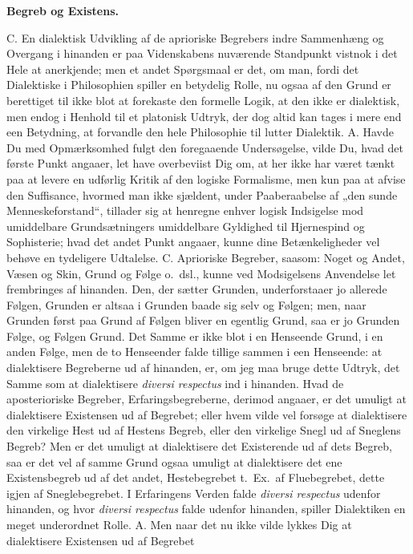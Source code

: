 \documentclass[12pt,a4paper]{book}
\begin{document}
\textbf{Begreb og Existens.}
C. En dialektisk Udvikling af de aprioriske Begrebers indre Sammenhæng
og Overgang i hinanden er paa Videnskabens nuværende Standpunkt vistnok
i det Hele at anerkjende; men et andet Spørgsmaal er det, om man, fordi
det Dialektiske i Philosophien spiller en betydelig Rolle, nu ogsaa af
den Grund er berettiget til ikke blot at forekaste den formelle Logik,
at den ikke er dialektisk, men endog i Henhold til et platonisk Udtryk,
der dog altid kan tages i mere end een Betydning, at forvandle den hele
Philosophie til lutter Dialektik. A. Havde Du med Opmærksomhed fulgt
den foregaaende Undersøgelse, vilde Du,
hvad det første Punkt angaaer, let have overbeviist Dig om, at her ikke
har været tænkt paa at levere en udførlig Kritik af den logiske
Formalisme, men kun paa at afvise den Suffisance, hvormed man ikke
sjældent, under Paaberaabelse af „den sunde Menneskeforstand“, tillader
sig at henregne enhver logisk Indsigelse mod umiddelbare Grundsætningers
umiddelbare Gyldighed til Hjernespind og Sophisterie; hvad det andet
Punkt angaaer, kunne dine Betænkeligheder vel behøve en tydeligere
Udtalelse. C. Aprioriske Begreber, saasom: Noget og Andet, Væsen og
Skin, Grund og Følge o.\ dsl., kunne ved Modsigelsens Anvendelse let
frembringes af hinanden. Den, der sætter Grunden, underforstaaer jo
allerede Følgen, Grunden er altsaa i Grunden baade sig selv og Følgen;
men, naar Grunden først paa Grund af Følgen bliver en egentlig Grund,
saa er jo Grunden Følge, og Følgen Grund. Det Samme er ikke blot i en
Henseende Grund, i en anden Følge, men de to Henseender falde tillige
sammen i een Henseende: at dialektisere Begreberne ud af hinanden, er,
om jeg maa bruge dette Udtryk, det Samme som at dialektisere
\textit{diversi respectus} ind i hinanden. Hvad de aposterioriske
Begreber, Erfaringsbegreberne, derimod angaaer, er det umuligt at
dialektisere Existensen ud af Begrebet; eller hvem vilde vel forsøge at
dialektisere den virkelige Hest ud af Hestens Begreb, eller den
virkelige Snegl ud af Sneglens Begreb? Men er det umuligt at
dialektisere det Existerende ud af dets Begreb, saa er det vel af samme
Grund ogsaa umuligt at dialektisere det ene Existensbegreb ud af det
andet, Hestebegrebet t.\ Ex.\ af Fluebegrebet, dette igjen af
Sneglebegrebet. I Erfaringens Verden falde \textit{diversi respectus}
udenfor hinanden, og hvor \textit{diversi respectus} falde udenfor
hinanden, spiller Dialektiken en meget underordnet Rolle. A. Men naar
det nu ikke vilde lykkes Dig at dialektisere Existensen ud af Begrebet
\end{document}
